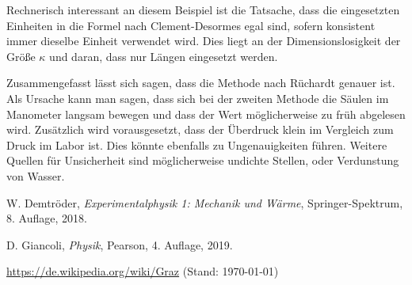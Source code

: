 \documentclass{article}
\begin{document}
Rechnerisch interessant an diesem Beispiel ist die Tatsache, dass die eingesetzten Einheiten in die Formel nach Clement-Desormes egal sind, sofern konsistent immer dieselbe Einheit verwendet wird. Dies liegt an der Dimensionslosigkeit der Größe $\kappa$ und daran, dass nur Längen eingesetzt werden.


Zusammengefasst lässt sich sagen, dass die Methode nach Rüchardt genauer ist. Als Ursache kann man sagen, dass sich bei der zweiten Methode die Säulen im Manometer langsam bewegen und dass der Wert möglicherweise zu früh abgelesen wird. Zusätzlich wird vorausgesetzt, dass der Überdruck klein im Vergleich zum Druck im Labor ist. Dies könnte ebenfalls zu Ungenauigkeiten führen. Weitere Quellen für Unsicherheit sind möglicherweise undichte Stellen, oder Verdunstung von Wasser.




\begin{thebibliography}{9}
 W. Demtröder, \emph{Experimentalphysik 1: Mechanik und Wärme}, Springer-Spektrum, 8. Auflage, 2018.

 D. Giancoli, \emph{Physik}, Pearson, 4. Auflage, 2019.

 \url{https://de.wikipedia.org/wiki/Graz} (Stand: \today)


\end{thebibliography}
\end{document}
